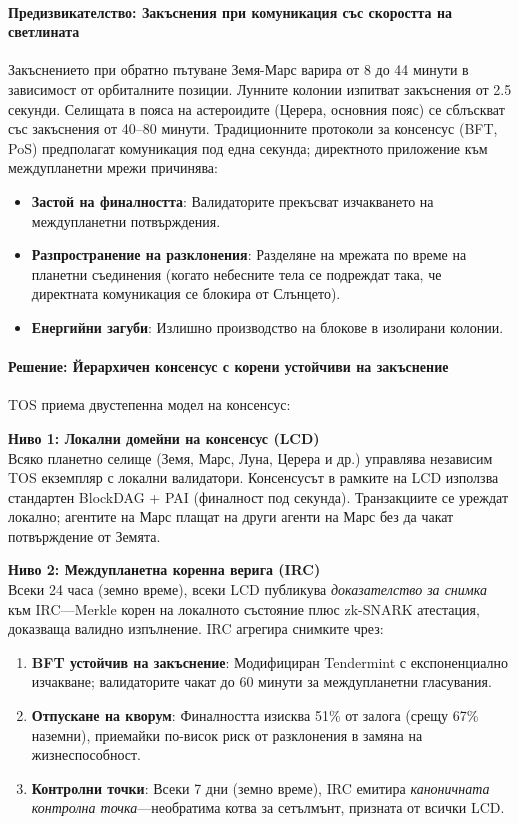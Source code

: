 \documentclass[11pt]{article}
\begin{document}
\paragraph{Предизвикателство: Закъснения при комуникация със скоростта на светлината}
Закъснението при обратно пътуване Земя-Марс варира от 8 до 44 минути в зависимост от орбиталните позиции. Лунните колонии изпитват закъснения от 2.5 секунди. Селищата в пояса на астероидите (Церера, основния пояс) се сблъскват със закъснения от 40--80 минути. Традиционните протоколи за консенсус (BFT, PoS) предполагат комуникация под една секунда; директното приложение към междупланетни мрежи причинява:
\begin{itemize}[noitemsep]
  \item \textbf{Застой на финалността}: Валидаторите прекъсват изчакването на междупланетни потвърждения.
  \item \textbf{Разпространение на разклонения}: Разделяне на мрежата по време на планетни съединения (когато небесните тела се подреждат така, че директната комуникация се блокира от Слънцето).
  \item \textbf{Енергийни загуби}: Излишно производство на блокове в изолирани колонии.
\end{itemize}

\paragraph{Решение: Йерархичен консенсус с корени устойчиви на закъснение}
TOS приема двустепенна модел на консенсус:

\textbf{Ниво 1: Локални домейни на консенсус (LCD)}\\
Всяко планетно селище (Земя, Марс, Луна, Церера и др.) управлява независим TOS екземпляр с локални валидатори. Консенсусът в рамките на LCD използва стандартен BlockDAG + PAI (финалност под секунда). Транзакциите се уреждат локално; агентите на Марс плащат на други агенти на Марс без да чакат потвърждение от Земята.

\textbf{Ниво 2: Междупланетна коренна верига (IRC)}\\
Всеки 24 часа (земно време), всеки LCD публикува \emph{доказателство за снимка} към IRC—Merkle корен на локалното състояние плюс zk-SNARK атестация, доказваща валидно изпълнение. IRC агрегира снимките чрез:
\begin{enumerate}[noitemsep]
  \item \textbf{BFT устойчив на закъснение}: Модифициран Tendermint с експоненциално изчакване; валидаторите чакат до 60 минути за междупланетни гласувания.
  \item \textbf{Отпускане на кворум}: Финалността изисква 51\% от залога (срещу 67\% наземни), приемайки по-висок риск от разклонения в замяна на жизнеспособност.
  \item \textbf{Контролни точки}: Всеки 7 дни (земно време), IRC емитира \emph{каноничната контролна точка}—необратима котва за сетълмънт, призната от всички LCD.
\end{enumerate}
\end{document}
